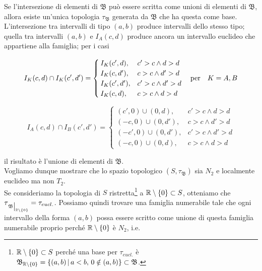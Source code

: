 Se l'intersezione di elementi di $ \mathfrak{B} $ può essere scritta come unioni di elementi di $ \mathfrak{B} $, allora esiste un'unica topologia $ \tau_{\mathfrak{B}} $ generata da $ \mathfrak{B} $ che ha questa come base.\\
L'intersezione tra intervalli di tipo $ (a,b) $ produce intervalli dello stesso tipo; quella tra intervalli $ (a,b) $ e $ I_{A}(c,d) $ produce ancora un intervallo euclideo che appartiene alla famiglia; per i casi

\begin{equation}
	I_{K}(c,d) \cap I_{K}(c',d') =%
		\begin{cases}
			I_{K}(c',d), & c' > c \wedge d > d\\
			I_{K}(c,d'), & c > c \wedge d' > d\\
			I_{K}(c',d'), & c' > c \wedge d' > d\\
			I_{K}(c,d), & c > c \wedge d > d
		\end{cases}%
	\qq{per} K = A, B
\end{equation}

\begin{equation}
	I_{A}(c,d) \cap I_{B}(c',d') = %
	\begin{cases}
		(c',0) \cup (0,d), & c' > c \wedge d > d\\
		(- c,0) \cup (0,d'), & c > c \wedge d' > d\\
		(- c',0) \cup (0,d'), & c' > c \wedge d' > d\\
		(- c,0) \cup (0,d), & c > c \wedge d > d
	\end{cases}
\end{equation}

il risultato è l'unione di elementi di $ \mathfrak{B} $.\\
Vogliamo dunque mostrare che lo spazio topologico $ (S,\tau_{\mathfrak{B}}) $ sia $ N_{2} $ e localmente euclideo ma non $ T_{2} $.\\
Se consideriamo la topologia di $ S $ ristretta\footnote{%
	$ \mathbb{R} \setminus \{0\} \subset S $ perché una base per $ \tau_{eucl.} $ è $ \mathfrak{B}_{\mathbb{R} \setminus \{0\}} = \left\{ (a,b) \, \middle| \, a<b, \, 0 \notin (a,b) \right\} \subset \mathfrak{B} $.%
} a $ \mathbb{R} \setminus \{0\} \subset S $, otteniamo che $ \tau_{\eval{\mathfrak{B}}_{\R \setminus \{0\}}} = \tau_{eucl.} $. Possiamo quindi trovare una famiglia numerabile tale che ogni intervallo della forma $ (a,b) $ possa essere scritto come unione di questa famiglia numerabile proprio perché $ \mathbb{R} \setminus \{0\} $ è $ N_{2} $, i.e.

